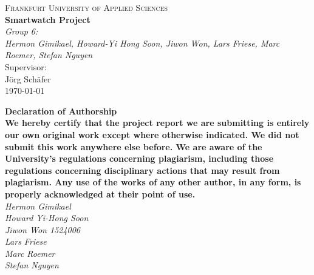 \documentclass{article}
\begin{document}
\begin{titlepage}
    \centering
    \vspace*{0cm}
    {\scshape\Large Frankfurt University of Applied Sciences}\\[3cm]
    {\huge\bfseries Smartwatch Project}\\[8cm]
    {\Large\itshape Group 6:}\\
    {\Large\itshape Hermon Gimikael, Howard-Yi Hong Soon, Jiwon Won, Lars Friese, Marc Roemer, Stefan Nguyen}\\[4cm]
    Supervisor:\\
    Jörg Schäfer\\[3cm]
    {\large \today}
\end{titlepage}

\begin{center}
    {\huge \textbf{Declaration of Authorship}\\}\vspace{15pt}
	{\normalsize \textbf{We hereby certify that the project report we are submitting is entirely our own original work except where otherwise indicated. We did not submit this work anywhere else before. We are aware of the University's regulations concerning plagiarism, including those regulations concerning disciplinary actions that may result from plagiarism. Any use of the works of any other author, in any form, is properly acknowledged at their point of use.}\\}\vspace{15pt}
	{\normalsize \itshape{Hermon Gimikael}\\}
	{\normalsize \itshape{Howard Yi-Hong Soon}\\}
	{\normalsize \itshape{Jiwon Won 1524006}\\}
	{\normalsize \itshape{Lars Friese}\\}
	{\normalsize \itshape{Marc Roemer}\\}
	{\normalsize \itshape{Stefan Nguyen}\\}
\end{center}
\clearpage

\tableofcontents
\newpage

\end{document}
